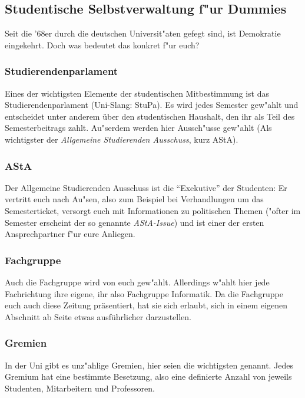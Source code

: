 \begin{multicols}{2}
	\subsection*{Studentische Selbstverwaltung f"ur Dummies}
		Seit die '68er durch die deutschen Universit"aten gefegt sind, ist Demokratie eingekehrt. Doch was bedeutet das konkret f"ur euch?

	\subsubsection*{Studierendenparlament}
		Eines der wichtigsten Elemente der studentischen Mitbestimmung ist das Studierendenparlament (Uni-Slang: StuPa). Es wird jedes Semester gew"ahlt und entscheidet unter anderem über den studentischen Haushalt, den ihr als Teil des Semesterbeitrags zahlt. Au"serdem werden hier Aussch"usse gew"ahlt (Als wichtigster der \emph{Allgemeine Studierenden Ausschuss}, kurz AStA).

	\subsubsection*{AStA}
		Der Allgemeine Studierenden Ausschuss ist die "`Exekutive"' der Studenten: Er vertritt euch nach Au"sen, also zum Beispiel bei Verhandlungen um das Semesterticket, versorgt euch mit Informationen zu politischen Themen ("ofter im Semester erscheint der so genannte \emph{AStA-Issue}) und ist einer der ersten Ansprechpartner f"ur eure Anliegen.

	\subsubsection*{Fachgruppe}
		Auch die Fachgruppe wird von euch gew"ahlt. Allerdings w"ahlt hier jede Fachrichtung ihre eigene, ihr also Fachgruppe Informatik. Da die Fachgruppe euch auch diese Zeitung präsentiert, hat sie sich erlaubt, sich in einem eigenen Abschnitt ab Seite \pageref{fachgruppe} etwas ausführlicher darzustellen.

	\subsubsection*{Gremien}
		In der Uni gibt es unz"ahlige Gremien, hier seien die wichtigsten genannt. Jedes Gremium hat eine bestimmte Besetzung, also eine definierte Anzahl von jeweils Studenten, Mitarbeitern und Professoren.


\end{multicols}
